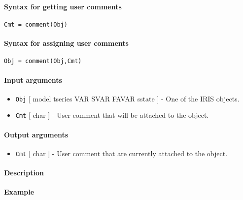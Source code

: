 


	\paragraph{Syntax for getting user
comments}

\begin{verbatim}
Cmt = comment(Obj)
\end{verbatim}

\paragraph{Syntax for assigning user
comments}

\begin{verbatim}
Obj = comment(Obj,Cmt)
\end{verbatim}

\paragraph{Input arguments}

\begin{itemize}
\item
  \texttt{Obj} {[} model \textbar{} tseries \textbar{} VAR \textbar{}
  SVAR \textbar{} FAVAR \textbar{} sstate {]} - One of the IRIS objects.
\item
  \texttt{Cmt} {[} char {]} - User comment that will be attached to the
  object.
\end{itemize}

\paragraph{Output arguments}

\begin{itemize}
\itemsep1pt\parskip0pt
\item
  \texttt{Cmt} {[} char {]} - User comment that are currently attached
  to the object.
\end{itemize}

\paragraph{Description}

\paragraph{Example}


